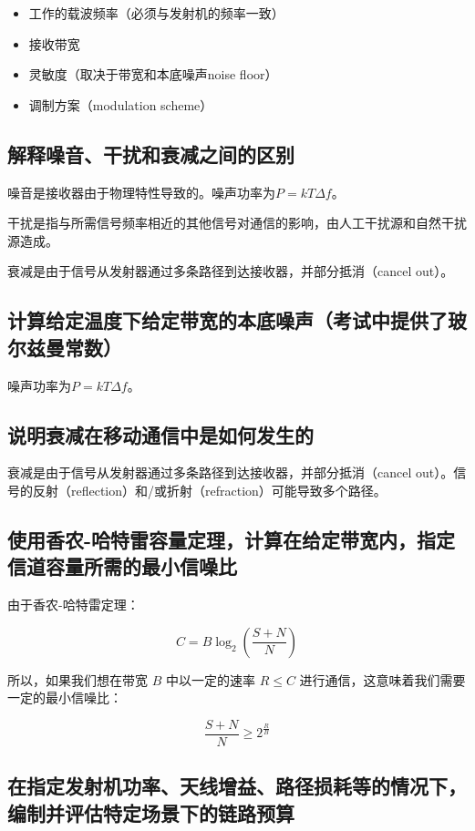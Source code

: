 \begin{itemize}
	\item 工作的载波频率（必须与发射机的频率一致）
	\item 接收带宽
	\item 灵敏度（取决于带宽和本底噪声noise floor）
	\item 调制方案（modulation scheme）
\end{itemize}

\subsection{解释噪音、干扰和衰减之间的区别}

噪音是接收器由于物理特性导致的。噪声功率为$P = kT\Delta f$。

干扰是指与所需信号频率相近的其他信号对通信的影响，由人工干扰源和自然干扰源造成。

衰减是由于信号从发射器通过多条路径到达接收器，并部分抵消（cancel out）。

\subsection{计算给定温度下给定带宽的本底噪声（考试中提供了玻尔兹曼常数）}

噪声功率为$P = kT\Delta f$。

\subsection{说明衰减在移动通信中是如何发生的}

衰减是由于信号从发射器通过多条路径到达接收器，并部分抵消（cancel out）。信号的反射（reflection）和/或折射（refraction）可能导致多个路径。

\subsection{使用香农-哈特雷容量定理，计算在给定带宽内，指定信道容量所需的最小信噪比}

由于香农-哈特雷定理：

\[C = B \log_2 (\frac{S + N}{N})\]

所以，如果我们想在带宽 $B$ 中以一定的速率 $R\leq C$ 进行通信，这意味着我们需要一定的最小信噪比：

\[\frac{S + N}{N} \geq 2^{\frac{R}{B}}\]

\subsection{在指定发射机功率、天线增益、路径损耗等的情况下，编制并评估特定场景下的链路预算}

